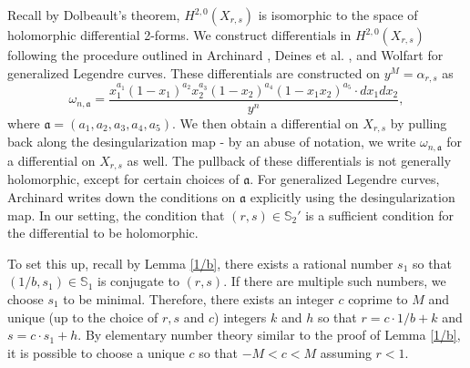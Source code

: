 \documentclass[12pt]{amsart}
\theoremstyle{definition}
\theoremstyle{remark}
\begin{document}
 Recall by Dolbeault's theorem, $H^{2,0}(X_{r,s})$ is isomorphic to the space of holomorphic differential 2-forms. We construct differentials in $H^{2,0}(X_{r,s})$ following the procedure outlined in Archinard \cite{archinard}, Deines et al. \cite{glc}, and  Wolfart \cite{wolfart} for generalized Legendre curves. These differentials are constructed on $y^M=\alpha_{r,s}$ as $$\omega_{n,\mathfrak{a}}=\frac{x_1^{a_1}(1-x_1)^{a_2}x_2^{a_3}(1-x_2)^{a_4}(1-x_1x_2)^{a_5}\cdot dx_1dx_2}{y^n},$$ where $\mathfrak{a}=(a_1,a_2,a_3,a_4,a_5)$. We then obtain a differential on $X_{r,s}$ by pulling back along the desingularization map - by an abuse of notation, we write $\omega_{n,\mathfrak{a}}$ for a differential on $X_{r,s}$ as well. The pullback of these differentials is not generally holomorphic, except for certain choices of $\mathfrak{a}$. For generalized Legendre curves, Archinard \cite{archinard} writes down the conditions on $\mathfrak{a}$ explicitly using the desingularization map. In our setting, the condition that $(r,s)\in \mathbb S_2'$ is a sufficient condition for the differential to be holomorphic.


To set this up, recall by Lemma \ref{1/b}, there exists a rational number $s_1$ so that $(1/b,s_1)\in \mathbb S_1$ is conjugate to $(r,s)$. If there are multiple such numbers, we choose $s_1$ to be minimal. Therefore, there exists an integer $c$ coprime to $M$ and unique (up to the choice of $r,s$ and $c$) integers $k$ and $h$ so that $r=c\cdot1/b+k$ and $s=c\cdot s_1+h$. By elementary number theory similar to the proof of Lemma \ref{1/b}, it is possible to choose a unique $c$ so that $-M<c<M$ assuming $r<1$.
\end{document}
